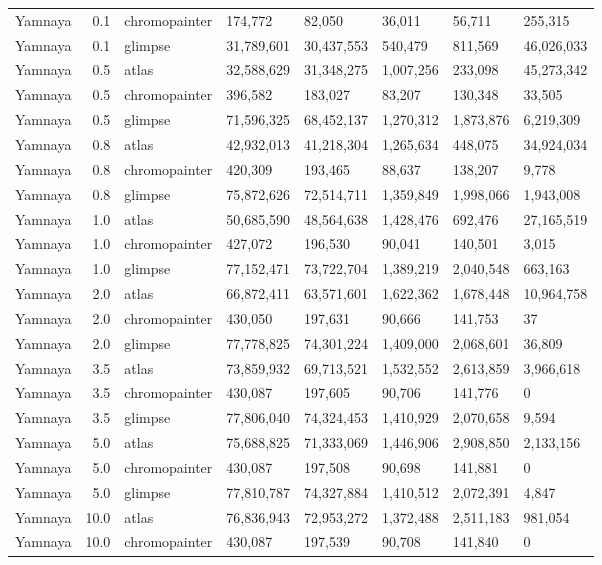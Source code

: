 {\begin{longtable}[t]{lrllllll}
Yamnaya & 0.1 & chromopainter & 174,772 & 82,050 & 36,011 & 56,711 & 255,315\\
Yamnaya & 0.1 & glimpse & 31,789,601 & 30,437,553 & 540,479 & 811,569 & 46,026,033\\
Yamnaya & 0.5 & atlas & 32,588,629 & 31,348,275 & 1,007,256 & 233,098 & 45,273,342\\
Yamnaya & 0.5 & chromopainter & 396,582 & 183,027 & 83,207 & 130,348 & 33,505\\
Yamnaya & 0.5 & glimpse & 71,596,325 & 68,452,137 & 1,270,312 & 1,873,876 & 6,219,309\\
Yamnaya & 0.8 & atlas & 42,932,013 & 41,218,304 & 1,265,634 & 448,075 & 34,924,034\\
Yamnaya & 0.8 & chromopainter & 420,309 & 193,465 & 88,637 & 138,207 & 9,778\\
Yamnaya & 0.8 & glimpse & 75,872,626 & 72,514,711 & 1,359,849 & 1,998,066 & 1,943,008\\
Yamnaya & 1.0 & atlas & 50,685,590 & 48,564,638 & 1,428,476 & 692,476 & 27,165,519\\
Yamnaya & 1.0 & chromopainter & 427,072 & 196,530 & 90,041 & 140,501 & 3,015\\
Yamnaya & 1.0 & glimpse & 77,152,471 & 73,722,704 & 1,389,219 & 2,040,548 & 663,163\\
Yamnaya & 2.0 & atlas & 66,872,411 & 63,571,601 & 1,622,362 & 1,678,448 & 10,964,758\\
Yamnaya & 2.0 & chromopainter & 430,050 & 197,631 & 90,666 & 141,753 & 37\\
Yamnaya & 2.0 & glimpse & 77,778,825 & 74,301,224 & 1,409,000 & 2,068,601 & 36,809\\
Yamnaya & 3.5 & atlas & 73,859,932 & 69,713,521 & 1,532,552 & 2,613,859 & 3,966,618\\
Yamnaya & 3.5 & chromopainter & 430,087 & 197,605 & 90,706 & 141,776 & 0\\
Yamnaya & 3.5 & glimpse & 77,806,040 & 74,324,453 & 1,410,929 & 2,070,658 & 9,594\\
Yamnaya & 5.0 & atlas & 75,688,825 & 71,333,069 & 1,446,906 & 2,908,850 & 2,133,156\\
Yamnaya & 5.0 & chromopainter & 430,087 & 197,508 & 90,698 & 141,881 & 0\\
Yamnaya & 5.0 & glimpse & 77,810,787 & 74,327,884 & 1,410,512 & 2,072,391 & 4,847\\
Yamnaya & 10.0 & atlas & 76,836,943 & 72,953,272 & 1,372,488 & 2,511,183 & 981,054\\
Yamnaya & 10.0 & chromopainter & 430,087 & 197,539 & 90,708 & 141,840 & 0\\

\end{longtable}}
